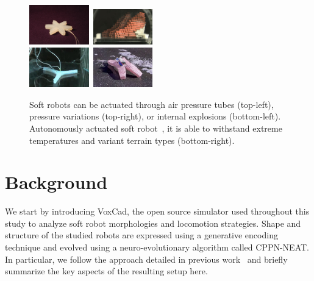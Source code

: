 \documentclass{sig-alternate}
\begin{document}
\begin{figure}[t!]
\centering
\includegraphics[width=0.23\textwidth,height=0.12\textheight]{../Figures/Misc/soft_robotics_figure.png}\	
\includegraphics[width=0.23\textwidth,height=0.12\textheight]{../Figures/Misc/hillerPressureChamber.png}\\[0.05cm]	
\includegraphics[width=0.23\textwidth,height=0.12\textheight]{../Figures/Misc/ExplodingRobot.jpg}\	
\includegraphics[width=0.23\textwidth,height=0.12\textheight]{../Figures/Misc/softbot.jpg}\\
\caption{Soft robots can be actuated through air pressure tubes (top-left), pressure variations (top-right), or internal explosions (bottom-left). Autonomously actuated soft robot~\cite{tolley2014resilient}, it is able to withstand extreme temperatures and variant terrain types (bottom-right).}
\label{fig:softRobotsActuation}
\vspace{0.2cm}
\end{figure}


\section{Background}
We start by introducing VoxCad, the open source simulator used throughout this study to analyze soft robot morphologies and locomotion strategies. Shape and structure of the studied robots are expressed using a generative encoding technique and evolved using a neuro-evolutionary algorithm called CPPN-NEAT. In particular, we follow the approach detailed in previous work~\cite{cheney2013unshackling} and briefly summarize the key aspects of the resulting setup here.
\end{document}
